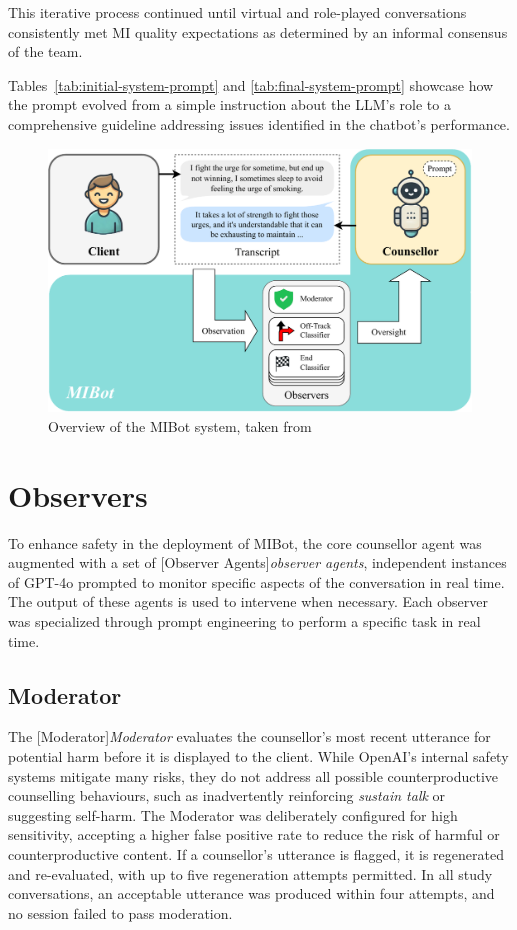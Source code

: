 This iterative process continued until virtual and role-played conversations consistently met MI quality expectations as determined by an informal consensus of the team.


Tables~\ref{tab:initial-system-prompt} and \ref{tab:final-system-prompt} showcase how the prompt evolved from a simple instruction about the LLM's role to a comprehensive guideline addressing issues identified in the chatbot's performance.




\begin{figure}[ht]
  \centering
  \includegraphics[width=0.9\linewidth]{fig/sysdiag.pdf} 
  \caption{Overview of the MIBot system, taken from \citet{mahmood-etal-2025-fully}}
  \label{fig:sysdiag}
\end{figure}

\section{Observers}
\label{sec:observers}
To enhance safety in the deployment of MIBot, the core counsellor agent was augmented with a set of [Observer Agents]\textit{observer agents}, independent instances of GPT-4o prompted to monitor specific aspects of the conversation in real time.  The output of these agents is used to intervene when necessary. Each observer was specialized through prompt engineering to perform a specific task in real time.

\subsection{Moderator}
The [Moderator]\textit{Moderator} evaluates the counsellor's most recent utterance for potential harm before it is displayed to the client. While OpenAI's internal safety systems mitigate many risks, they do not address all possible counterproductive counselling behaviours, such as inadvertently reinforcing \emph{sustain talk} or suggesting self-harm. The Moderator was deliberately configured for high sensitivity, accepting a higher false positive rate to reduce the risk of harmful or counterproductive content. If a counsellor's utterance is flagged, it is regenerated and re-evaluated, with up to five regeneration attempts permitted. In all study conversations, an acceptable utterance was produced within four attempts, and no session failed to pass moderation.


